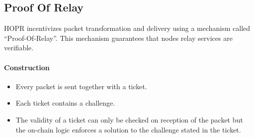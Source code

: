 \subsection{Proof Of Relay}

HOPR incentivizes packet transformation and delivery using a mechanism called “Proof-Of-Relay”.
This mechanism guarantees that nodes relay services are verifiable.
\paragraph{Construction}
\begin{itemize}
    \item Every packet is sent together with a ticket.
    \item Each ticket contains a challenge.
    \item The validity of a ticket can only be checked on reception of the packet but the on-chain logic enforces a solution to the challenge stated in the ticket.
\end{itemize}

